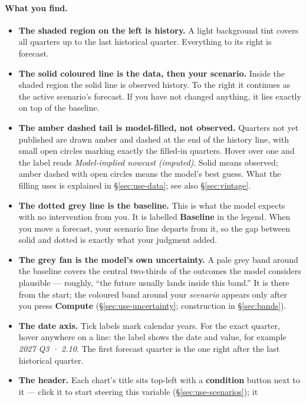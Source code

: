 \documentclass[11pt]{article}
\theoremstyle{definition}
\theoremstyle{remark}
\begin{document}
\paragraph{What you find.}
\begin{itemize}
  \item \textbf{The shaded region on the left is history.} A light background tint covers all
    quarters up to the last historical quarter. Everything to its right is forecast.
  \item \textbf{The solid coloured line is the data, then your scenario.} Inside the shaded
    region the solid line is observed history. To the right it continues as the active
    scenario's forecast. If you have not changed anything, it lies exactly on top of the
    baseline.
  \item \textbf{The amber dashed tail is model-filled, not observed.} Quarters not yet
    published are drawn amber and dashed at the end of the history line, with small open
    circles marking exactly the filled-in quarters. Hover over one and the label reads
    \emph{Model-implied nowcast (imputed)}. Solid means observed; amber dashed with open
    circles means the model's best guess. What the filling uses is explained in
    \S\ref{sec:use-data}; see also \S\ref{sec:vintage}.
  \item \textbf{The dotted grey line is the baseline.} This is what the model expects with no
    intervention from you. It is labelled \textbf{Baseline} in the legend. When you move a
    forecast, your scenario line departs from it, so the gap between solid and dotted is
    exactly what your judgment added.
  \item \textbf{The grey fan is the model's own uncertainty.} A pale grey band around the
    baseline covers the central two-thirds of the outcomes the model considers plausible ---
    roughly, ``the future usually lands inside this band.'' It is there from the start; the
    coloured band around your \emph{scenario} appears only after you press \textbf{Compute}
    (\S\ref{sec:use-uncertainty}; construction in \S\ref{sec:bands}).
  \item \textbf{The date axis.} Tick labels mark calendar years. For the exact quarter, hover
    anywhere on a line: the label shows the date and value, for example \emph{2027 Q3 · 2.10}.
    The first forecast quarter is the one right after the last historical quarter.
  \item \textbf{The header.} Each chart's title sits top-left with a \textbf{condition} button
    next to it --- click it to start steering this variable (\S\ref{sec:use-scenarios}); it

\end{itemize}
\end{document}
